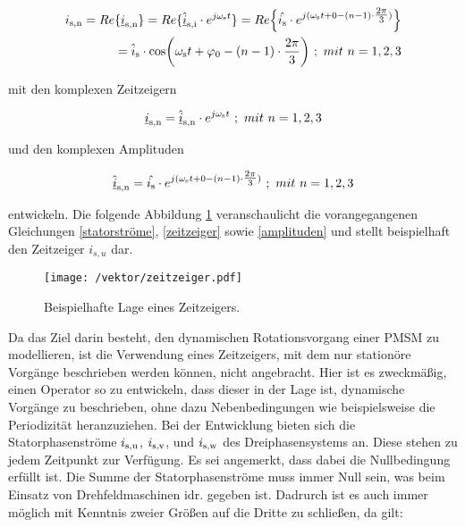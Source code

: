 \begin{align}
	\begin{split}
    i_\i{s,n} = Re\{\underline{i}_\i{s,n}\} = Re\{\underline{\hat i}_\i{s,i}\cdot e^{j\omega_\i{s}t}\} = Re\Bigl\{\hat{i_\i{s}}\cdot e^{j(\omega_\i{s}t+0-(n-1)\cdot\tfrac{2\pi}{3})}\Bigr\}
	\\=\hat{i}_\i{s}\cdot\si{cos}\bigg(\omega_\i{s}t+\varphi_\i{0}-(n-1)\cdot\frac{2\pi}{3}\bigg)~;~mit~n=1,2,3 \label{statorströme} 
\end{split}
\end{align}

mit den komplexen Zeitzeigern

\begin{align}
	\underline{i}_\i{s,n} = \underline{\hat i}_\i{s,n}\cdot e^{j\omega_\i{s}t}~;~mit~n=1,2,3 \label{zeitzeiger}
\end{align}

und den komplexen Amplituden

\begin{align}
	\underline{\hat i}_\i{s,n} = \hat{i_\i{s}}\cdot e^{j(\omega_\i{s}t+0-(n-1)\cdot\tfrac{2\pi}{3})}~;~mit~n=1,2,3 \label{amplituden}
\end{align}

entwickeln. 
Die folgende Abbildung \ref{fig:zeitzeiger} veranschaulicht die vorangegangenen Gleichungen \ref{statorströme}, \ref{zeitzeiger} sowie \ref{amplituden} und stellt beispielhaft den Zeitzeiger $i_{s,u}$ dar.

\begin{figure}[h]
	\centering
	\texttt{[image: /vektor/zeitzeiger.pdf]}
	\label{fig:zeitzeiger}
	\caption{Beispielhafte Lage eines Zeitzeigers.}
\end{figure}

Da das Ziel darin besteht, den dynamischen Rotationsvorgang einer PMSM zu modellieren, ist die Verwendung eines Zeitzeigers, mit dem nur stationöre Vorgänge beschrieben werden können, nicht angebracht. 
Hier ist es zweckmäßig, einen Operator so zu entwickeln, dass dieser in der Lage ist, dynamische Vorgänge zu beschrieben, ohne dazu Nebenbedingungen wie beispielsweise die Periodizität heranzuziehen. 
Bei der Entwicklung bieten sich die Statorphasenströme $i_\i{s,u}$, $i_\i{s,v}$, und $i_\i{s,w}$ des Dreiphasensystems an.
Diese stehen zu jedem Zeitpunkt zur Verfügung. 
Es sei angemerkt, dass dabei die Nullbedingung erfüllt ist. 
Die Summe der Statorphasenströme muss immer Null sein, was beim Einsatz von Drehfeldmaschinen idr. gegeben ist.
Dadrurch ist es auch immer möglich mit Kenntnis zweier Größen auf die Dritte zu schließen, da gilt:

